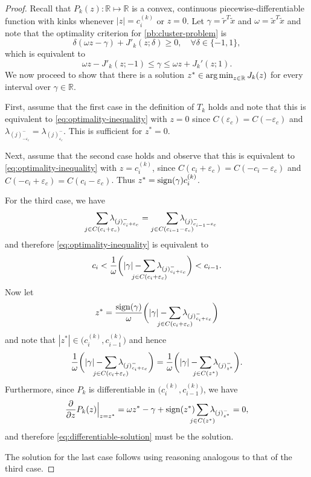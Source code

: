\begin{proof}
  Recall that \(P_k(z) : \mathbb{R} \mapsto \mathbb{R}\) is a convex,
  continuous piecewise-differentiable function with kinks whenever \(|z| =
  c_i^{(k)}\) or \(z = 0\). Let \(\gamma = \tilde{r}^T\tilde{x}\)
  and \(\omega = \tilde{x}^T\tilde{x}\) and note that the optimality criterion for
  \eqref{pb:cluster-problem} is
  \[
    \delta(\omega z - \gamma) + J'_k(z; \delta) \geq 0, \quad
    \forall \delta \in \{-1, 1\},
  \]
  which is equivalent to
  \begin{equation}
    \label{eq:optimality-inequality}
    \omega z - J'_k(z; -1) \leq \gamma \leq \omega z + J_k'(z; 1).
  \end{equation}
  We now proceed to show that there is a solution \(z^* \in \operatorname*{arg\,min}_{z \in
    \mathbb{R}} J_k(z)\) for every interval over \(\gamma \in \mathbb{R}\).

  First, assume that the first case in the definition of \(T_k\) holds
  and note that this is equivalent to \eqref{eq:optimality-inequality} with \(z
  = 0\) since \(C({\varepsilon_c}) = C(-{\varepsilon_c})\) and
  \(\lambda_{(j)^-_{-{\varepsilon_c}}} = \lambda_{(j)^-_{{\varepsilon_c}}}\).
  This is sufficient for \(z^* = 0\).

  Next, assume that the second case holds and observe that this is equivalent
  to \eqref{eq:optimality-inequality} with
  \(z = c_i^{(k)}\), since
  \(C(c_i + {\varepsilon_c}) = C(-c_i - {\varepsilon_c})\) and
  \(C(-c_i + {\varepsilon_c}) = C(c_i - {\varepsilon_c})\). Thus \(z^* =
  \operatorname{sign}(\gamma)c_i^{(k)}\).

  For the third case, we have
  \[
    \smashoperator{\sum_{j \in C(c_i + {\varepsilon_c})}} \lambda_{(j)^-_{c_i + {\varepsilon_c}}}
    =
    \smashoperator[r]{\sum_{j \in C(c_{i-1} - {\varepsilon_c})}} \lambda_{(j)^-_{c_{i-1} - {\varepsilon_c}}}
  \]
  and therefore \eqref{eq:optimality-inequality} is equivalent to
  \[
    c_i < \frac{1}{\omega} \bigg( |\gamma| - \smashoperator{\sum_{j \in C(c_i + {\varepsilon_c})}} \lambda_{(j)^-_{c_i + {\varepsilon_c}}} \bigg) < c_{i -1}.
  \]
  Now let
  \begin{equation}
    \label{eq:differentiable-solution}
    z^* = \frac{\sign(\gamma)}{\omega} \bigg( |\gamma| - \smashoperator{\sum_{j \in C(c_i + {\varepsilon_c})}} \lambda_{(j)^-_{c_i + {\varepsilon_c}}} \bigg)
  \end{equation}
  and note that \(|z^*| \in \big(c_i^{(k)}, c_{i-1}^{(k)}\big)\) and hence
  \[
    \frac{1}{\omega} \bigg( |\gamma| - \smashoperator{\sum_{j \in C(c_i + {\varepsilon_c})}} \lambda_{(j)^-_{c_i + {\varepsilon_c}}} \bigg)
    =
    \frac{1}{\omega} \bigg( |\gamma| - \smashoperator{\sum_{j \in C(z^*)}} \lambda_{(j)^-_{z^*}} \bigg).
  \]
  Furthermore, since \(P_k\) is differentiable in \(\big(c_i^{(k)}, c_{i-1}^{(k)}\big)\), we have
  \[
    \frac{\partial}{\partial z} P_k(z) \Big|_{z = z^*}
    = \omega z^* - \gamma + \sign(z^*) \smashoperator{\sum_{j \in C(z^*)}} \lambda_{(j)^-_{z^*}} = 0,
  \]
  and therefore \eqref{eq:differentiable-solution} must be the solution.

  The solution for the last case follows using reasoning analogous to that of the
  third case.
\end{proof}

